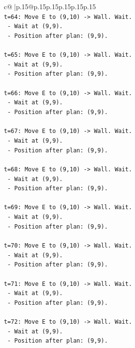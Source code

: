\documentclass{article}
\begin{document}
{\begin{supertabular}{c@{$\;$}|p{.15\linewidth}@{}p{.15\linewidth}p{.15\linewidth}p{.15\linewidth}p{.15\linewidth}p{.15\linewidth}}
{{{\\ 
\texttt{t=64: Move E to (9,10) {-}> Wall. Wait.} \\
\texttt{   {-} Wait at (9,9).} \\
\texttt{   {-} Position after plan: (9,9).} \\
\\ 
\texttt{t=65: Move E to (9,10) {-}> Wall. Wait.} \\
\texttt{   {-} Wait at (9,9).} \\
\texttt{   {-} Position after plan: (9,9).} \\
\\ 
\texttt{t=66: Move E to (9,10) {-}> Wall. Wait.} \\
\texttt{   {-} Wait at (9,9).} \\
\texttt{   {-} Position after plan: (9,9).} \\
\\ 
\texttt{t=67: Move E to (9,10) {-}> Wall. Wait.} \\
\texttt{   {-} Wait at (9,9).} \\
\texttt{   {-} Position after plan: (9,9).} \\
\\ 
\texttt{t=68: Move E to (9,10) {-}> Wall. Wait.} \\
\texttt{   {-} Wait at (9,9).} \\
\texttt{   {-} Position after plan: (9,9).} \\
\\ 
\texttt{t=69: Move E to (9,10) {-}> Wall. Wait.} \\
\texttt{   {-} Wait at (9,9).} \\
\texttt{   {-} Position after plan: (9,9).} \\
\\ 
\texttt{t=70: Move E to (9,10) {-}> Wall. Wait.} \\
\texttt{   {-} Wait at (9,9).} \\
\texttt{   {-} Position after plan: (9,9).} \\
\\ 
\texttt{t=71: Move E to (9,10) {-}> Wall. Wait.} \\
\texttt{   {-} Wait at (9,9).} \\
\texttt{   {-} Position after plan: (9,9).} \\
\\ 
\texttt{t=72: Move E to (9,10) {-}> Wall. Wait.} \\
\texttt{   {-} Wait at (9,9).} \\
\texttt{   {-} Position after plan: (9,9).} \\
}}}
\end{supertabular}}
\end{document}
